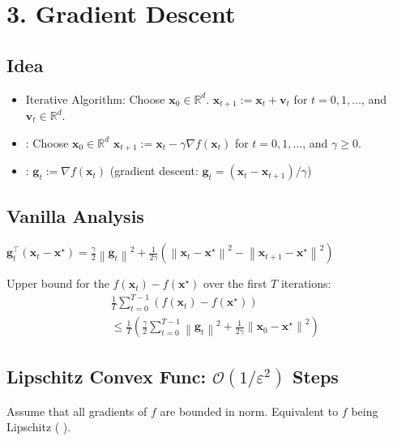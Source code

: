 \section*{3. Gradient Descent}
\subsection*{Idea}
\begin{itemize}[leftmargin=*]
    \item Iterative Algorithm: Choose $\mathbf{x}_{0} \in \mathbb{R}^{d}$.
$
\mathbf{x}_{t+1}:=\mathbf{x}_{t}+\mathbf{v}_{t}
$
for  $t=0,1, \ldots$, and  $\mathbf{v}_{t} \in \mathbb{R}^{d}$.
    \item {}: Choose $\mathbf{x}_{0} \in \mathbb{R}^{d}$
$
\mathbf{x}_{t+1}:=\mathbf{x}_{t}-\gamma \nabla f\left(\mathbf{x}_{t}\right)
$
for  $t=0,1, \ldots$, and  $\gamma \geq 0$.

    \item {}: $\mathbf{g}_{t}:=\nabla f\left(\mathbf{x}_{t}\right)$ (gradient descent: $\mathbf{g}_{t}=\left(\mathbf{x}_{t}-\mathbf{x}_{t+1}\right) / \gamma$)
\end{itemize}

\subsection*{Vanilla Analysis}
$\mathbf{g}_{t}^{\top}\left(\mathbf{x}_{t}-\mathbf{x}^{\star}\right) = \frac{\gamma}{2}\left\|\mathbf{g}_{t}\right\|^{2}+\frac{1}{2 \gamma}\left(\left\|\mathbf{x}_{t}-\mathbf{x}^{\star}\right\|^{2}-\left\|\mathbf{x}_{t+1}-\mathbf{x}^{\star}\right\|^{2}\right)$


Upper bound for the  $f\left(\mathbf{x}_{t}\right)-f\left(\mathbf{x}^{\star}\right)$ over the first $T$ iterations:
$$
\begin{aligned}
&\frac{1}{T} \sum_{t=0}^{T-1}\left(f\left(\mathbf{x}_{t}\right)-f\left(\mathbf{x}^{\star}\right)\right) \\ 
&\leq \frac{1}{T}\left(\frac{\gamma}{2} \sum_{t=0}^{T-1}\left\|\mathbf{g}_{t}\right\|^{2}+\frac{1}{2 \gamma}\left\|\mathbf{x}_{0}-\mathbf{x}^{\star}\right\|^{2}\right) 
\end{aligned}
$$

\subsection*{Lipschitz Convex Func: $\mathcal{O}\left(1 / \varepsilon^{2}\right)$ Steps}
Assume that all gradients of $f$ are bounded in norm. Equivalent to $f$ being Lipschitz ( ).

